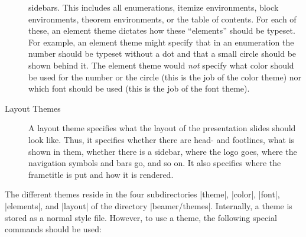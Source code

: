 \begin{description}
  sidebars. This includes all enumerations, itemize environments,
  block environments, theorem environments, or the table of
  contents. For each of these, an element theme dictates how these
  ``elements'' should be typeset. For example, an element theme might
  specify that in an enumeration the number should be typeset without
  a dot and that a small circle should be shown behind it. The element
  theme would \emph{not} specify what color should be used for the
  number or the circle (this is the job of the color theme) nor which font
  should be used (this is the job of the font theme).
\item[Layout Themes]
  A layout theme specifies what the layout of the presentation slides
  should look like. Thus, it specifies whether there are head- and
  footlines, what is shown in them, whether there is a sidebar, where
  the logo goes, where the navigation symbols and bars go, and so
  on. It also specifies where the frametitle is put and how it is
  rendered. 
\end{description}

The different themes reside in the four subdirectories |theme|, |color|,
|font|, |elements|, and |layout| of the directory
|beamer/themes|. Internally, a theme is stored as a normal style
file. However, to use a theme, the following special commands should
be used:






